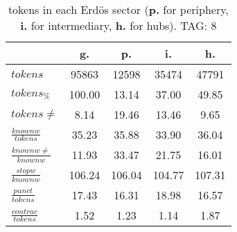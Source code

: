 \begin{table}[h!]
\begin{center}
\begin{tabular}{| l || c | c | c | c |}\hline
 & {\bf g.} & {\bf p.} & {\bf i.} & {\bf h.} \\\hline\hline
$tokens$ & 95863  & 12598  & 35474  & 47791 \\
$tokens_{\%}$ & 100.00  & 13.14  & 37.00  & 49.85 \\
$tokens \neq$ & 8.14  & 19.46  & 13.46  & 9.65 \\\hline
$\frac{knownw}{tokens}$ & 35.23  & 35.88  & 33.90  & 36.04 \\
$\frac{knownw \neq}{knownw}$ & 11.93  & 33.47  & 21.75  & 16.01 \\\hline
$\frac{stopw}{knownw}$ & 106.24  & 106.04  & 104.77  & 107.31 \\
$\frac{punct}{tokens}$ & 17.43  & 16.31  & 18.98  & 16.57 \\
$\frac{contrac}{tokens}$ & 1.52  & 1.23  & 1.14  & 1.87 \\\hline
\end{tabular}
\caption{tokens in each Erd\"os sector ({{\bf p.}} for periphery, {{\bf i.}} for intermediary, 
    {{\bf h.}} for hubs). TAG: 8}
\end{center}
\end{table}